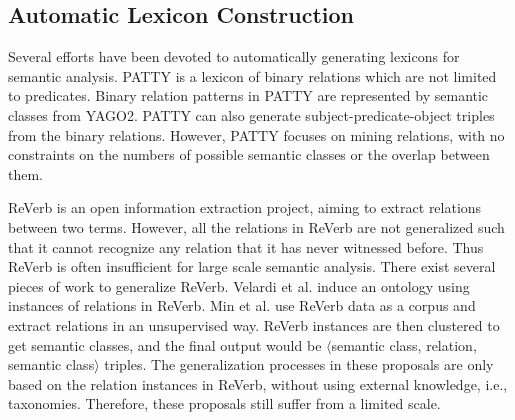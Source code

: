 \subsection{Automatic Lexicon Construction}
Several efforts have been devoted to automatically
generating lexicons for semantic analysis.
PATTY\cite{nakashole2012patty} is a lexicon of binary relations
which are not limited to predicates.
Binary relation patterns in PATTY are represented by
semantic classes from YAGO2\cite{SuchanekKW07}.
PATTY can also generate subject-predicate-object triples from
the binary relations\cite{nakashole2013discovering}. However, PATTY
focuses on mining relations, with no constraints on the
numbers of possible semantic classes or the overlap between
them.

ReVerb is an open information extraction project, aiming to
extract relations between two terms. However, all the relations in
ReVerb are not generalized such that it cannot recognize any
relation that it has never witnessed before. Thus ReVerb
is often insufficient for large scale semantic analysis.
There exist several pieces of work to generalize ReVerb.
Velardi et al.\cite{velardi2013open} induce an ontology
using instances of relations in ReVerb.
Min et al.\cite{min2012ensemble} use ReVerb data
as a corpus and extract relations in an unsupervised way.
ReVerb instances are then clustered to get semantic classes,
and the final output would be $\langle$semantic class,
relation, semantic class$\rangle$ triples.
The generalization processes in these proposals are only based
on the relation instances in ReVerb, without using external
knowledge, i.e., taxonomies. Therefore, these proposals still suffer
from a limited scale.


